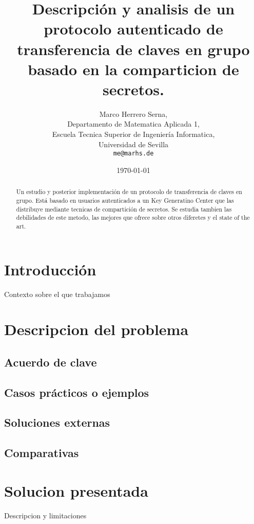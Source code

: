 \documentclass[11pt, spanish]{report}
\begin{document}
\title{Descripción y analisis de un protocolo autenticado de transferencia de claves en grupo basado en la comparticion de secretos.}
\author{Marco Herrero Serna,\\
        Departamento de Matematica Aplicada 1,\\
        Escuela Tecnica Superior de Ingeniería Informatica,\\
        Universidad de Sevilla\\
        \texttt{me@marhs.de}}
\date{\today}
\maketitle


\begin{abstract}
Un estudio y posterior implementación de un protocolo de transferencia de claves en grupo. Está basado en usuarios autenticados a un Key Generatino Center que las distribuye mediante tecnicas de compartición de secretos. Se estudia tambien las debilidades de este metodo, las mejores que ofrece sobre otros diferetes y el state of the art. 
\end{abstract}

\section{Introducción}
 
Contexto sobre el que trabajamos

\section{Descripcion del problema}
    \subsection{Acuerdo de clave}
    \subsection{Casos prácticos o ejemplos }
    \subsection{Soluciones externas }
    \subsection{Comparativas }

\section{Solucion presentada}
Descripcion y limitaciones
\end{document}

